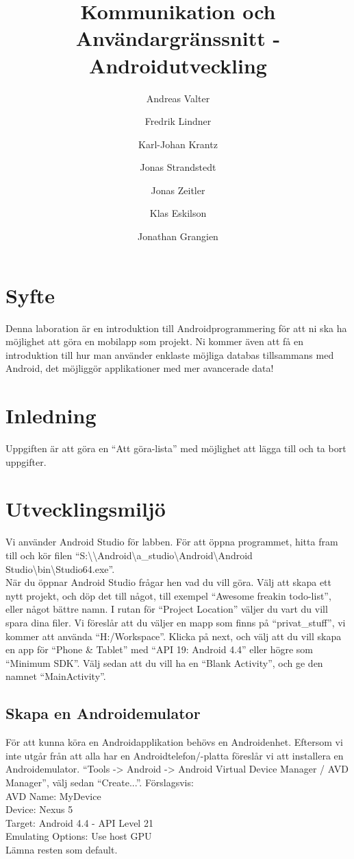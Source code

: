 \documentclass[11 pt, titlepage]{article} %
\begin{document}
\title{Kommunikation och Användargränssnitt - Androidutveckling}
\author{Andreas Valter \and Fredrik Lindner \and Karl-Johan Krantz \and Jonas Strandstedt \and Jonas Zeitler \and Klas Eskilson \and Jonathan Grangien}
\maketitle

\section{Syfte}
Denna laboration är en introduktion till Androidprogrammering för att ni ska ha möjlighet att göra en mobilapp som projekt.
Ni kommer även att få en introduktion till hur man använder enklaste möjliga databas tillsammans med Android, det möjliggör applikationer med mer avancerade data!
\section{Inledning}
Uppgiften är att göra en “Att göra-lista” med möjlighet att lägga till och ta bort uppgifter.
\section{Utvecklingsmiljö}
Vi använder Android Studio för labben. För att öppna programmet, hitta fram till och kör filen ``S:\textbackslash \textbackslash Android\textbackslash a\_studio\textbackslash Android\textbackslash Android Studio\textbackslash bin\textbackslash Studio64.exe''.\\

När du öppnar Android Studio frågar hen vad du vill göra.
Välj att skapa ett nytt projekt, och döp det till något, till exempel ``Awesome freakin todo-list'', eller något bättre namn.
I rutan för ``Project Location'' väljer du vart du vill spara dina filer.
Vi föreslår att du väljer en mapp som finns på “privat\_stuff”, vi kommer att använda “H:/Workspace”.
Klicka på next, och välj att du vill skapa en app för ``Phone \& Tablet'' med ``API 19: Android 4.4'' eller högre som ``Minimum SDK''.
Välj sedan att du vill ha en ``Blank Activity'', och ge den namnet ``MainActivity''.\\

\subsection{Skapa en Androidemulator}
För att kunna köra en Androidapplikation behövs en Androidenhet.
Eftersom vi inte utgår från att alla har en Androidtelefon/-platta föreslår vi att installera en Androidemulator.
“Tools -> Android -> Android Virtual Device Manager / AVD Manager”, välj sedan “Create...”. Förslagsvis:
\\
AVD Name: MyDevice\\
Device:  Nexus 5\\
Target:  Android 4.4 - API Level 21\\
Emulating Options:  Use host GPU\\
Lämna resten som default.\\
\end{document}
